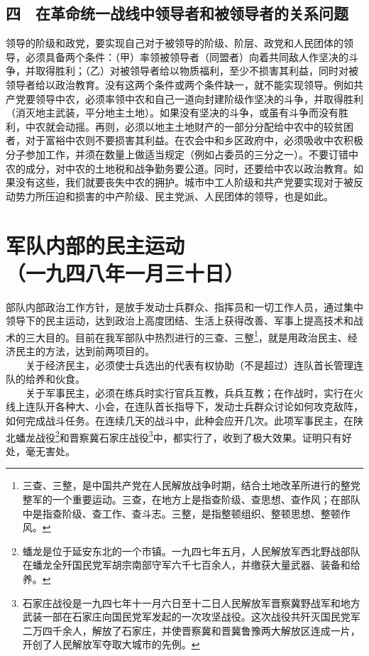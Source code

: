 \documentclass[cn,11pt,chinese]{elegantbook}
\def\myformat#1{\hfil\hfil #1}
\begin{document}
\subsection*{\myformat{四　在革命统一战线中领导者和被领导者的关系问题}}
领导的阶级和政党，要实现自己对于被领导的阶级、阶层、政党和人民团体的领导，必须具备两个条件：（甲）率领被领导者（同盟者）向着共同敌人作坚决的斗争，并取得胜利；（乙）对被领导者给以物质福利，至少不损害其利益，同时对被领导者给以政治教育。没有这两个条件或两个条件缺一，就不能实现领导。例如共产党要领导中农，必须率领中农和自己一道向封建阶级作坚决的斗争，并取得胜利（消灭地主武装，平分地主土地）。如果没有坚决的斗争，或虽有斗争而没有胜利，中农就会动摇。再则，必须以地主土地财产的一部分分配给中农中的较贫困者，对于富裕中农则不要损害其利益。在农会中和乡区政府中，必须吸收中农积极分子参加工作，并须在数量上做适当规定（例如占委员的三分之一）。不要订错中农的成分，对中农的土地税和战争勤务要公道。同时，还要给中农以政治教育。如果没有这些，我们就要丧失中农的拥护。城市中工人阶级和共产党要实现对于被反动势力所压迫和损害的中产阶级、民主党派、人民团体的领导，也是如此。\\
\newpage\section*{\myformat{军队内部的民主运动}\\\myformat{（一九四八年一月三十日）}}
部队内部政治工作方针，是放手发动士兵群众、指挥员和一切工作人员，通过集中领导下的民主运动，达到政治上高度团结、生活上获得改善、军事上提高技术和战术的三大目的。目前在我军部队中热烈进行的三查、三整\footnote[1]{ 三查、三整，是中国共产党在人民解放战争时期，结合土地改革所进行的整党整军的一个重要运动。三查，在地方上是指查阶级、查思想、查作风；在部队中是指查阶级、查工作、查斗志。三整，是指整顿组织、整顿思想、整顿作风。}，就是用政治民主、经济民主的方法，达到前两项目的。\\
　　关于经济民主，必须使士兵选出的代表有权协助（不是超过）连队首长管理连队的给养和伙食。\\
　　关于军事民主，必须在练兵时实行官兵互教，兵兵互教；在作战时，实行在火线上连队开各种大、小会，在连队首长指导下，发动士兵群众讨论如何攻克敌阵，如何完成战斗任务。在连续几天的战斗中，此种会应开几次。此项军事民主，在陕北蟠龙战役\footnote[2]{ 蟠龙是位于延安东北的一个市镇。一九四七年五月，人民解放军西北野战部队在蟠龙全歼国民党军胡宗南部守军六千七百余人，并缴获大量武器、装备和给养。}和晋察冀石家庄战役\footnote[3]{ 石家庄战役是一九四七年十一月六日至十二日人民解放军晋察冀野战军和地方武装一部在石家庄向国民党军发起的一次攻坚战役。这次战役共歼灭国民党军二万四千余人，解放了石家庄，并使晋察冀和晋冀鲁豫两大解放区连成一片，开创了人民解放军夺取大城市的先例。}中，都实行了，收到了极大效果。证明只有好处，毫无害处。\\
\end{document}
